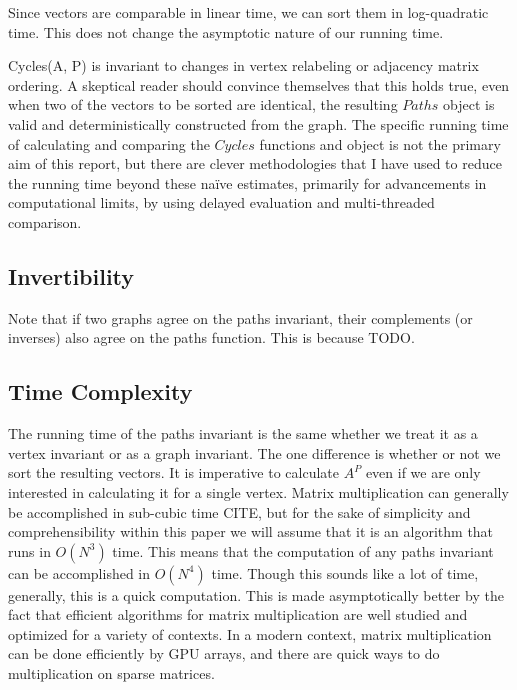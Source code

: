 \documentclass[11pt,a4paper]{report}
\begin{document}
Since vectors are comparable in linear time, we can sort them in log-quadratic time.
This does not change the asymptotic nature of our running time.

Cycles(A, P) is invariant to changes in vertex relabeling or adjacency matrix ordering.
A skeptical reader should convince themselves that this holds true, even when two of the vectors to be sorted are identical, the resulting $Paths$ object is valid and deterministically constructed from the graph.
The specific running time of calculating and comparing the $Cycles$ functions and object is not the primary aim of this report, but there are clever methodologies that I have used to reduce the running time beyond these na\"{i}ve estimates, primarily for advancements in computational limits, by using delayed evaluation and multi-threaded comparison.

\subsection{Invertibility}
Note that if two graphs agree on the paths invariant, their complements (or inverses) also agree on the paths function.
This is because TODO.

\subsection{Time Complexity}
The running time of the paths invariant is the same whether we treat it as a vertex invariant or as a graph invariant.
The one difference is whether or not we sort the resulting vectors.
It is imperative to calculate $A^P$ even if we are only interested in calculating it for a single vertex.
Matrix multiplication can generally be accomplished in sub-cubic time CITE, but for the sake of simplicity and comprehensibility within this paper we will assume that it is an algorithm that runs in $O(N^3)$  time.
This means that the computation of any paths invariant can be accomplished in $O(N^4)$ time.
Though this sounds like a lot of time, generally, this is a quick computation.
This is made asymptotically better by the fact that efficient algorithms for matrix multiplication are well studied and optimized for a variety of contexts.
In a modern context, matrix multiplication can be done efficiently by GPU arrays, and there are quick ways to do multiplication on sparse matrices.
\end{document}
